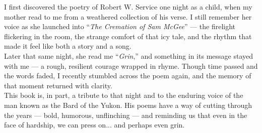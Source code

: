 \vspace{1em}
I first discovered the poetry of Robert W. Service one night as a child, when my mother read to me from a weathered collection of his verse. I still remember her voice as she launched into “\textit{The Cremation of Sam McGee}” — the firelight flickering in the room, the strange comfort of that icy tale, and the rhythm that made it feel like both a story and a song.\\

Later that same night, she read me “\textit{Grin},” and something in its message stayed with me — a rough, resilient courage wrapped in rhyme. Though time passed and the words faded, I recently stumbled across the poem again, and the memory of that moment returned with clarity.\\

This book is, in part, a tribute to that night and to the enduring voice of the man known as the Bard of the Yukon. His poems have a way of cutting through the years — bold, humorous, unflinching — and reminding us that even in the face of hardship, we can press on... and perhaps even grin.

